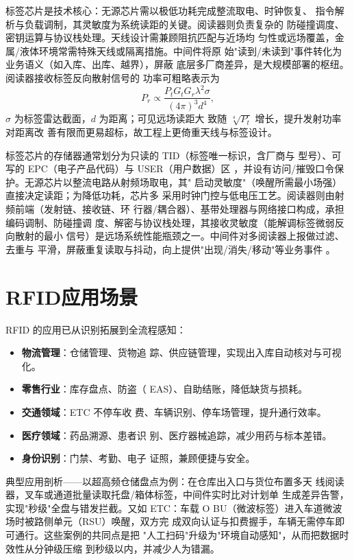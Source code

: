 标签芯片是技术核心：无源芯片需以极低功耗完成整流取电、时钟恢复、
指令解析与负载调制，其灵敏度为系统读距的关键。阅读器则负责复杂的
防碰撞调度、密钥运算与协议栈处理。天线设计需兼顾阻抗匹配与近场均
匀性或远场覆盖，金属/液体环境常需特殊天线或隔离措施。中间件将原
始"读到/未读到"事件转化为业务语义（如入库、出库、越界），屏蔽
底层多厂商差异，是大规模部署的枢纽。阅读器接收标签反向散射信号的
功率可粗略表示为
\begin{equation}
P_r \propto \frac{P_t G_t G_r \lambda^2 \sigma}{(4\pi)^3 d^4},
\end{equation}
$\sigma$ 为标签雷达截面，$d$ 为距离；可见远场读距大
致随 $\sqrt[4]{P_t}$ 增长，提升发射功率对距离改
善有限而更易超标，故工程上更倚重天线与标签设计。

标签芯片的存储器通常划分为只读的 TID（标签唯一标识，含厂商与
型号）、可写的 EPC（电子产品代码）与 USER（用户数据）区
，并设有访问/摧毁口令保护。无源芯片以整流电路从射频场取电，其"
启动灵敏度"（唤醒所需最小场强）直接决定读距；为降低功耗，芯片多
采用时钟门控与低电压工艺。阅读器则由射频前端（发射链、接收链、环
行器/耦合器）、基带处理器与网络接口构成，承担编码调制、防碰撞调
度、解密与协议栈处理，其接收灵敏度（能解调标签微弱反向散射的最小
信号）是远场系统性能瓶颈之一。中间件对多阅读器上报做过滤、去重与
平滑，屏蔽重复读取与抖动，向上提供"出现/消失/移动"等业务事件
。

\section{RFID应用场景}
\label{sec:rfid_applications}

RFID 的应用已从识别拓展到全流程感知：

\begin{itemize}
    \item \textbf{物流管理}：仓储管理、货物追
踪、供应链管理，实现出入库自动核对与可视化。
    \item \textbf{零售行业}：库存盘点、防盗（
EAS）、自助结账，降低缺货与损耗。
    \item \textbf{交通领域}：ETC 不停车收
费、车辆识别、停车场管理，提升通行效率。
    \item \textbf{医疗领域}：药品溯源、患者识
别、医疗器械追踪，减少用药与标本差错。
    \item \textbf{身份识别}：门禁、考勤、电子
证照，兼顾便捷与安全。
\end{itemize}

典型应用剖析——以超高频仓储盘点为例：在仓库出入口与货位布置多天
线阅读器，叉车或通道批量读取托盘/箱体标签，中间件实时比对计划单
生成差异告警，实现"秒级"全盘与错发拦截。又如 ETC：车载 O
BU（微波标签）进入车道微波场时被路侧单元（RSU）唤醒，双方完
成双向认证与扣费握手，车辆无需停车即可通行。这些案例的共同点是把
"人工扫码"升级为"环境自动感知"，从而把数据时效性从分钟级压缩
到秒级以内，并减少人为错漏。


